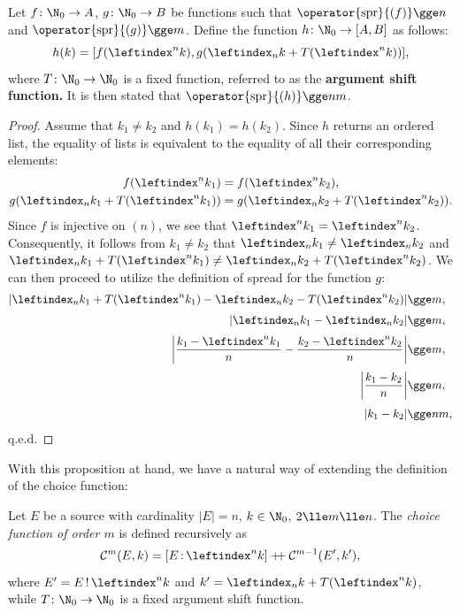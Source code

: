 \documentclass[12pt, a4paper]{article}
\newcommand{\C}{\mathcal{C}}
\newcommand{\dop}{\mathbin{{+}\hspace{-1mm}{+}}}
\newcommand{\spr}[1]{\operator{\mathrm{spr}}{\left(#1\right)}}
\newcommand{\lli}[1]{\leftindex_{#1}}
\newcommand{\lui}[1]{\leftindex^{#1}}
\newcommand{\elt}{\mathop{:}}
\newcommand{\wo}{\mathop{!}}
\begin{document}
\begin{proposition}\label{map}
    Let $ f \colon \N_0 \to A $, $ g \colon \N_0 \to B $ be functions such that $ \spr{f} \gge n $ and $ \spr{g} \gge m $. Define the function $ h \colon \N_0 \to [A, B] $ as follows:
    \[ h(k) = [f(\lui{n}k), g(\lli{n}k + T(\lui{n}k))], \]
    where $ T \colon \N_0 \to \N_0 $ is a fixed function, referred to as the \textbf{argument shift function.} It is then stated that $ \spr{h} \gge nm $.
\end{proposition}
\begin{proof}
    Assume that $ k_1 \ne k_2 $ and $ h(k_1) = h(k_2) $. Since $ h $ returns an ordered list, the equality of lists is equivalent to the equality of all their corresponding elements:
    \begin{gather*}
        f(\lui{n}k_1) = f(\lui{n}k_2),\label{one}\\
        g(\lli{n}k_1 + T(\lui{n}k_1)) = g(\lli{n}k_2 + T(\lui{n}k_2)).\label{two}
    \end{gather*}
    Since $ f $ is injective on $ (n) $, we see that $ \lui{n}k_1 = \lui{n}k_2 $. Consequently, it follows from $ k_1 \ne k_2 $ that $ \lli{n}k_1 \ne \lli{n}k_2 $ and $ \lli{n}k_1 + T(\lui{n}k_1) \ne \lli{n}k_2 + T(\lui{n}k_2) $. We can then proceed to utilize the definition of spread for the function $ g $:
    \begin{align*}
    | \lli{n}k_1 + T(\lui{n}k_1) - \lli{n}k_2 - T(\lui{n}k_2) | &\gge m,\\[1mm]
    | \lli{n}k_1 - \lli{n}k_2 | &\gge m,\\[1mm]
    \left| \frac{k_1 - \lui{n}k_1}{n} - \frac{k_2 - \lui{n}k_2}{n} \right| &\gge m,\\[1mm]
    \left| \frac{k_1 - k_2}{n} \right| &\gge m,\\[1mm]
    | k_1 - k_2 | &\gge nm,
    \end{align*}
    q.e.d.
\end{proof}

With this proposition at hand, we have a natural way of extending the definition of the choice function:

\begin{definition}
    Let $ E $ be a source with cardinality $ |E| = n $, $ k \in \N_0 $, $ 2 \lle m \lle n $. The \emph{choice function of order $ m $} is defined recursively as
    \[ \C^m(E, k) = [E \elt \lui{n}k] \dop \C^{m-1}(E', k'), \]
    where $ E' = E \wo \lui{n}k $ and $ k' = \lli{n}k + T(\lui{n}k) $, while $ T \colon \N_0 \to \N_0 $ is a fixed argument shift function.
\end{definition}
\end{document}
